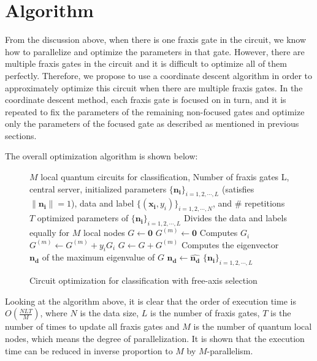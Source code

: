 \section{Algorithm}
\par From the discussion above, when there is one fraxis gate in the circuit, we know how to parallelize and optimize the parameters in that gate. However, there are multiple fraxis gates in the circuit and it is difficult to optimize all of them perfectly. Therefore, we propose to use a coordinate descent algorithm in order to approximately optimize this circuit when there are multiple fraxis gates. In the coordinate descent method, each fraxis gate is focused on in turn, and it is repeated to fix the parameters of the remaining non-focused gates and optimize only the parameters of the focused gate as described as mentioned in previous sections.

\par The overall optimization algorithm is shown below:

\begin{figure}[htb]
\begin{algorithm}[H]
\label{alg:algdis}
  \begin{algorithmic}[1]
    \caption{Circuit optimization for classification with free-axis selection}
        \Require $M$ local quantum circuits for classification, Number of fraxis gates L, central server, initialized parameters $\{\bm{n_i}\}_{i=1,2,\cdots,L}$ (satisfies $\|\bm{n_i}\|=1$), data and label $\{(\bm{x_{i}}, y_i)\}_{i = 1, 2, \cdots, N}$, and \# repetitions $T$
        \Ensure optimized parameters of $\{\bm{n_i}\}_{i=1,2,\cdots,L}$
        \State Divides the data and labels equally for $M$ local nodes
                \State $G \longleftarrow \bm{0}$
                    \State $G^{(m)} \longleftarrow \bm{0}$
                            \State Computes $G_i$
                            \State $G^{(m)} \longleftarrow G^{(m)}+ y_iG_i$ 
                        \EndFor
                    \State $G\longleftarrow G+G^{(m)}$ 
                \EndFor
                \State Computes the eigenvector $\bm{\hat{n_d}}$ of the maximum eigenvalue of $G$
                \State $\bm{n_d} \longleftarrow \bm{\hat{n_d}}$
            \EndFor
        \EndFor
        \State \Return $\{\bm{n_i}\}_{i=1,2,\cdots,L}$
  \end{algorithmic}
  \end{algorithm}
\end{figure}

Looking at the algorithm above, it is clear that the order of execution time is $O(\frac{NLT}{M})$, where $N$ is the data size, $L$ is the number of fraxis gates, $T$ is the number of times to update all fraxis gates and $M$ is the number of quantum local nodes, which means the degree of parallelization. It is shown that the execution time can be reduced in inverse proportion to $M$ by $M$-parallelism.